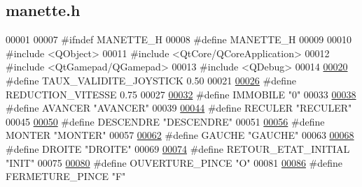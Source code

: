 \hypertarget{manette_8h_source}{}\subsection{manette.\+h}
\label{manette_8h_source}

\begin{DoxyCode}
00001 
00007 \textcolor{preprocessor}{#ifndef MANETTE\_H}
00008 \textcolor{preprocessor}{#define MANETTE\_H}
00009 
00010 \textcolor{preprocessor}{#include <QObject>}
00011 \textcolor{preprocessor}{#include <QtCore/QCoreApplication>}
00012 \textcolor{preprocessor}{#include <QtGamepad/QGamepad>}
00013 \textcolor{preprocessor}{#include <QDebug>}
00014 
\hyperlink{manette_8h_a1ae244fc787303cd46a9b684fb4b4056}{00020} \textcolor{preprocessor}{#define TAUX\_VALIDITE\_JOYSTICK 0.50}
00021 
\hyperlink{manette_8h_a26e43ead1d984ddabb462b55010d12f6}{00026} \textcolor{preprocessor}{#define REDUCTION\_VITESSE 0.75}
00027 
\hyperlink{manette_8h_a16ccf2890fcfc78a47402fe94becb6ca}{00032} \textcolor{preprocessor}{#define IMMOBILE "0"}
00033 
\hyperlink{manette_8h_af54a6d7aa82993b62caabaaf5b3f1459}{00038} \textcolor{preprocessor}{#define AVANCER "AVANCER"}
00039 
\hyperlink{manette_8h_a26da42c0f048eced1fff947bac0c2b3d}{00044} \textcolor{preprocessor}{#define RECULER "RECULER"}
00045 
\hyperlink{manette_8h_a0f61ab9ae13b77038540b31843a6c2ea}{00050} \textcolor{preprocessor}{#define DESCENDRE "DESCENDRE"}
00051 
\hyperlink{manette_8h_a765e6ea0e13ca38a457aa563930ce2df}{00056} \textcolor{preprocessor}{#define MONTER "MONTER"}
00057 
\hyperlink{manette_8h_af07f8bf974fdf76afd17f2b97ac15a22}{00062} \textcolor{preprocessor}{#define GAUCHE "GAUCHE"}
00063 
\hyperlink{manette_8h_af625d3f3bc022848a558f2b18def5b15}{00068} \textcolor{preprocessor}{#define DROITE "DROITE"}
00069 
\hyperlink{manette_8h_a0d14fc3b862ee6b41366ac22e9737025}{00074} \textcolor{preprocessor}{#define RETOUR\_ETAT\_INITIAL "INIT"}
00075 
\hyperlink{manette_8h_a0259cc955736c3970883196448e0476a}{00080} \textcolor{preprocessor}{#define OUVERTURE\_PINCE "O"}
00081 
\hyperlink{manette_8h_a1c242b29a47122b6c528f2bcb73a29e2}{00086} \textcolor{preprocessor}{#define FERMETURE\_PINCE "F"}

\end{DoxyCode}
